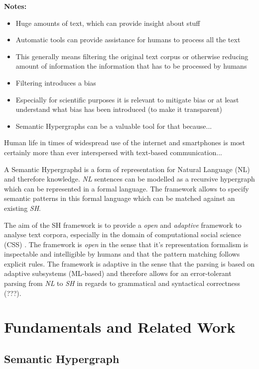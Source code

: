 \documentclass[11pt]{scrreprt}
\begin{document}
\textbf{Notes:}
\begin{itemize}
	\item Huge amounts of text, which can provide insight about stuff
	\item Automatic tools can provide assistance for humans to process all the text
	\item This generally means filtering the original text corpus or otherwise reducing amount of information the information that has to be processed by humans
	\item Filtering introduces a bias
	\item Especially for scientific purposes it is relevant to mitigate bias or at least understand what bias has been introduced (to make it transparent)
	\item Semantic Hypergraphs can be a valuable tool for that because...
\end{itemize}


Human life in times of widespread use of the internet and smartphones is most certainly more than ever interspersed with text-based communication...


A Semantic Hypergraphd \cite{menezes_semantic_2021} is a form of representation for Natural Language (NL) and therefore knowledge. \textit{NL} sentences can be modelled as a recursive hypergraph which can be represented in a formal language. The framework allows to specify semantic patterns in this formal language which can be matched against an existing \textit{SH}.

The aim of the SH framework is to provide a \textit{open} and \textit{adaptive} framework to analyse text corpora, especially in the domain of computational social science (CSS) \cite{lazer2009computational}. The framework is \textit{open} in the sense that it's representation formalism is inspectable and intelligible by humans and that the pattern matching follows explicit rules. The framework is adaptive in the sense that the parsing is based on adaptive subsystems (ML-based) and therefore allows for an error-tolerant parsing from \textit{NL} to \textit{SH} in regards to grammatical and syntactical correctness (???).




\chapter{Fundamentals and Related Work}
\section{Semantic Hypergraph}
\end{document}
